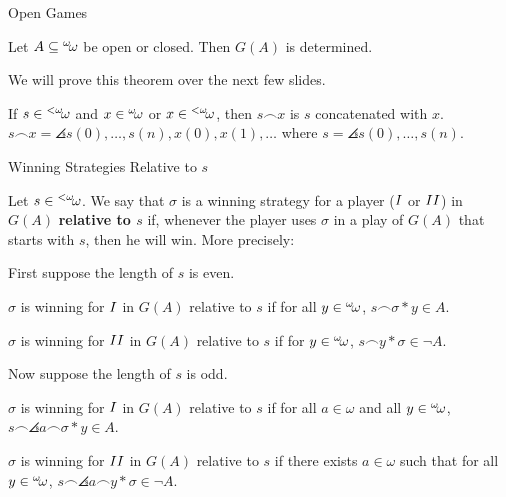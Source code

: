\documentclass[pdf,final]{prosper}
\newcommand{\skipsmall}{\vspace{1em}}
\newcommand{\skipmed}{\vspace{2em}}
\begin{document}
\begin{slide}{Open Games}
\begin{theorem}
Let $A\subseteq{}^{\omega}\!{\omega}$ be open or closed. Then $G(A)$ is determined.
\end{theorem}


\skipsmall

We will prove this theorem over the next few slides.

\skipmed

\begin{definition}
If $s\in{}^{<\omega}\!{\omega}$ and $x\in{}^{\omega}\!{\omega}$ or $x\in{}^{<\omega}\!{\omega}$, then $s\frown x$
is $s$ concatenated with $x$. 
\newline
$s\frown x = \angles{s(0),\dots,s(n),x(0),x(1),\dots}$ 
\newline
where $s=\angles{s(0),\dots,s(n)}$.
\end{definition}

\skipsmall



\end{slide}

\begin{slide}{Winning Strategies Relative to $s$}

\begin{definition}
Let $s\in{}^{<\omega}\!{\omega}$. We say that $\sigma$ is a winning strategy for a player
($I$ or $II$) in $G(A)$ \textbf{relative to $s$}
if, whenever the player uses $\sigma$ in a play of $G(A)$ that starts with $s$,
then he will win. More precisely:

\skipsmall

First suppose the length of $s$ is even. 

\skipsmall

 $\sigma$ is winning for $I$ in
$G(A)$ relative to $s$ if for all $y\in{}^{\omega}\!{\omega}$, $s\frown\sigma*y\in A$.

\skipsmall

 $\sigma$ is winning for $II$ in
$G(A)$ relative to $s$ if for  $y\in{}^{\omega}\!{\omega}$,
$s\frown y*\sigma\in \neg A$.

\skipsmall

Now suppose the length of $s$ is odd.

\skipsmall

 $\sigma$ is winning for $I$ in
$G(A)$ relative to $s$ if for all $a\in\omega$ and all $y\in{}^{\omega}\!{\omega}$,
$s\frown\angles{a}\frown\sigma*y\in A$.

\skipsmall

 $\sigma$ is winning for $II$ in
$G(A)$ relative to $s$ if there exists $a\in\omega$ such that for all
$y\in{}^{\omega}\!{\omega}$, $s\frown\angles{a}\frown y*\sigma\in \neg A$.

\end{definition}

\end{slide}
\end{document}
